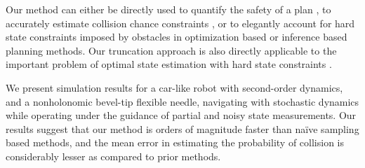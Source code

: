 

Our method can either be directly used to quantify the safety of a plan \cite{vandenBerg11_IJRR, Patil11_RSS}, to accurately estimate collision chance constraints \cite{Bry11_ICRA, Vitus11_ICRA}, or to elegantly account for hard state constraints imposed by obstacles in optimization based \cite{Platt10_RSS, Erez10_UAI, vandenBerg11_ISRR} or inference based \cite{Toussaint09_ICML} planning methods. Our truncation approach is also directly applicable to the important problem of optimal state estimation with hard state constraints \cite{Book:Simon06}.

We present simulation results for a car-like robot with second-order dynamics, and a nonholonomic bevel-tip flexible needle, navigating with stochastic dynamics while operating under the guidance of partial and noisy state measurements. Our results suggest that our method is orders of magnitude faster than na\"{i}ve sampling based methods, and the mean error in estimating the probability of collision is considerably lesser as compared to prior methods.
